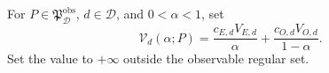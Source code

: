 For \(P\in\mathfrak P_{\mathcal D}^{\mathrm{obs}}\), \(d\in\mathcal D\), and \(0<\alpha<1\), set
\[
\mathcal V_d(\alpha;P)=\frac{c_{E,d}V_{E,d}}{\alpha}+\frac{c_{O,d}V_{O,d}}{1-\alpha}.
\]
Set the value to \(+\infty\) outside the observable regular set.
